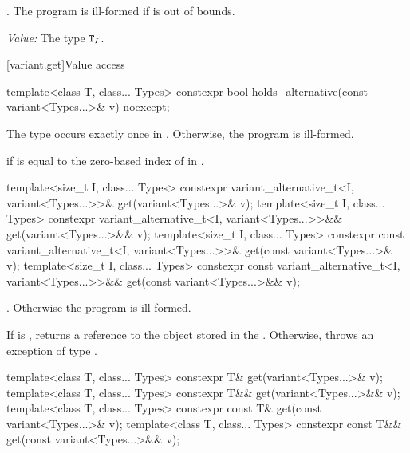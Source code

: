 \begin{itemdescr}
\pnum
\requires {}.
The program is ill-formed if  is out of bounds.

\pnum
\textit{Value:} The type $\texttt{T}_I$.
\end{itemdescr}

[variant.get]{Value access}

\begin{itemdecl}
template<class T, class... Types>
  constexpr bool holds_alternative(const variant<Types...>& v) noexcept;
\end{itemdecl}

\begin{itemdescr}
\pnum
\requires
The type  occurs exactly once in .
Otherwise, the program is ill-formed.

\pnum
\returns
{} if  is equal to the zero-based index of  in .
\end{itemdescr}

%
\begin{itemdecl}
template<size_t I, class... Types>
  constexpr variant_alternative_t<I, variant<Types...>>& get(variant<Types...>& v);
template<size_t I, class... Types>
  constexpr variant_alternative_t<I, variant<Types...>>&& get(variant<Types...>&& v);
template<size_t I, class... Types>
  constexpr const variant_alternative_t<I, variant<Types...>>& get(const variant<Types...>& v);
template<size_t I, class... Types>
  constexpr const variant_alternative_t<I, variant<Types...>>&& get(const variant<Types...>&& v);
\end{itemdecl}

\begin{itemdescr}
\pnum
\requires
{}.
Otherwise the program is ill-formed.

\pnum
\effects
If  is , returns a reference to the object stored in
the . Otherwise, throws an exception of type .
\end{itemdescr}

%
\begin{itemdecl}
template<class T, class... Types> constexpr T& get(variant<Types...>& v);
template<class T, class... Types> constexpr T&& get(variant<Types...>&& v);
template<class T, class... Types> constexpr const T& get(const variant<Types...>& v);
template<class T, class... Types> constexpr const T&& get(const variant<Types...>&& v);
\end{itemdecl}

